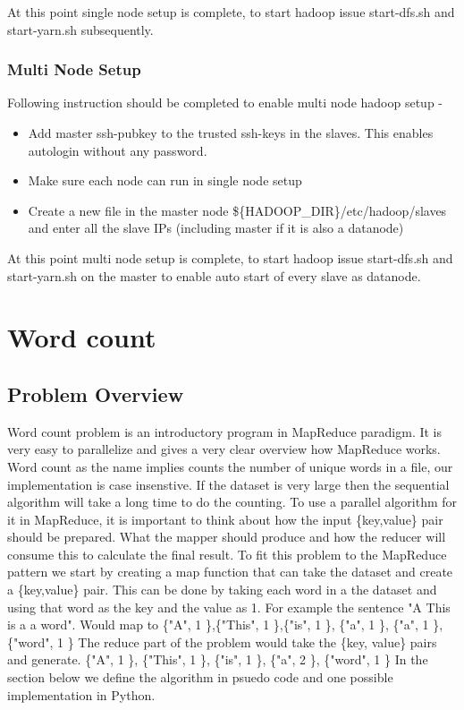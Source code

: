 \documentclass{article}
\begin{document}
At this point single node setup is complete, to start hadoop issue start-dfs.sh and start-yarn.sh subsequently.

\subsubsection{Multi Node Setup}
Following instruction should be completed to enable multi node hadoop setup -
\begin{itemize}
\item Add master ssh-pubkey to the trusted ssh-keys in the slaves. This enables autologin without any password.
\item Make sure each node can run in single node setup
\item Create a new file in the master node  \$\{HADOOP\_DIR\}/etc/hadoop/slaves and enter all the slave IPs (including master if it is also a datanode)
\end{itemize}

At this point multi node setup is complete, to start hadoop issue start-dfs.sh and start-yarn.sh on the master to enable auto start of every slave as datanode.

\section{Word count}
\subsection{Problem Overview}
Word count problem is an introductory program in MapReduce paradigm. It is very easy to parallelize and gives a very clear overview how MapReduce works.
\BlankLine Word count as the name implies counts the number of unique words in a file, our implementation is case insenstive. If the dataset is very large then the sequential algorithm will take a long time to do the counting.
To use a parallel algorithm for it in MapReduce, it is important to think about how the input \{key,value\} pair should be prepared. What the mapper should produce and how the reducer will consume this to calculate the final result.
To fit this problem to the MapReduce pattern we start by creating a map function that can take the dataset and create a \{key,value\} pair.
This can be done by taking each word in a the dataset and using that word as the key and the value as 1.
 For example the sentence "A This is a a word". Would map to
 \BlankLine \{"A", 1 \},\{"This", 1 \},\{"is", 1 \}, \{"a", 1 \}, \{"a", 1 \},  \{"word", 1 \}
\BlankLine The reduce part of the problem would take the \{key, value\} pairs and generate.
\BlankLine \{"A", 1 \}, \{"This", 1 \}, \{"is", 1 \}, \{"a", 2 \},  \{"word", 1 \}
\BlankLine In the section below we define the algorithm in psuedo code and one possible implementation in Python.
\end{document}
